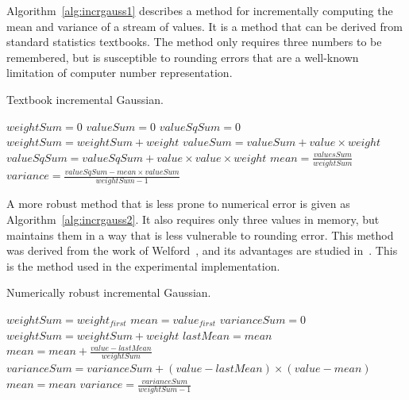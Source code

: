 Algorithm~\ref{alg:incrgauss1} describes a method for incrementally computing the mean and variance of a stream of values. It is a method that can be derived from standard statistics textbooks. The method only requires three numbers to be remembered, but is susceptible to rounding errors that are a well-known limitation of computer number representation.

\begin{algorithm}
\caption{Textbook incremental Gaussian.}
\begin{algorithmic}
\STATE $weightSum = 0$
\STATE $valueSum = 0$
\STATE $valueSqSum = 0$
\STATE $weightSum = weightSum + weight$
\STATE $valueSum = valueSum + value \times weight$
\STATE $valueSqSum = valueSqSum + value \times value \times weight$
\ENDFOR
\STATE
{}
\RETURN $mean = \frac{valuesSum}{weightSum}$
\RETURN $variance = \frac{valueSqSum - mean \times valueSum}{weightSum - 1}$
\end{algorithmic}
\label{alg:incrgauss1}
\end{algorithm}

A more robust method that is less prone to numerical error is given as Algorithm~\ref{alg:incrgauss2}. It also requires only three values in memory, but maintains them in a way that is less vulnerable to rounding error. This method was derived from the work of Welford~\cite{welfordincr}, and its advantages are studied in~\cite{gaussincr}. This is the method used in the experimental implementation.

\begin{algorithm}
\caption{Numerically robust incremental Gaussian.}
\begin{algorithmic}
\STATE $weightSum = weight_{first}$
\STATE $mean = value_{first}$
\STATE $varianceSum = 0$
\STATE $weightSum = weightSum + weight$
\STATE $lastMean = mean$
\STATE $mean = mean + \frac{value - lastMean}{weightSum}$
\STATE $varianceSum = varianceSum + (value - lastMean) \times (value - mean)$
\ENDFOR
\STATE
{}
\RETURN $mean = mean$
\RETURN $variance = \frac{varianceSum}{weightSum - 1}$
\end{algorithmic}
\label{alg:incrgauss2}
\end{algorithm}

